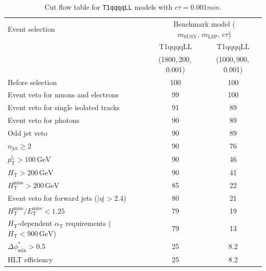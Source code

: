 \clearpage
\begin{table}[!h]
  \caption{Cut flow table for \texttt{T1qqqqLL} models with $c\tau = 0.001\unit{mm}$.} 
  \label{tab:cut_flow_ctau_0p001}
{\scriptsize%
\centering
\begin{tabular}{lcc}
  \hline
  Event selection & \multicolumn{2}{c}{Benchmark model ($m_\mathrm{SUSY},\,m_\mathrm{LSP},\,c\tau$)} \\
  \cline{2-3}
   & T1qqqqLL & T1qqqqLL \\
   & (1800,\,200,\,0.001) & (1000,\,900,\,0.001) \\
  \hline
  Before selection & 100\phantom{.1} & 100\phantom{.1} \\
  Event veto for muons and electrons & \phantom{1}99\phantom{.1} & 100\phantom{.1} \\
  Event veto for single isolated tracks & \phantom{1}91\phantom{.1} & \phantom{1}89\phantom{.1}  \\
  Event veto for photons & \phantom{1}90\phantom{.1} & \phantom{1}89\phantom{.1} \\
  Odd jet veto & \phantom{1}90\phantom{.1} & \phantom{1}89\phantom{.1} \\
   $n_{\mathrm{jet}} \geq 2$ & \phantom{1}90\phantom{.1} & \phantom{1}76\phantom{.1}  \\
   $p_{\mathrm{T}}^{\mathrm{j_1}} > 100\,\mathrm{GeV}$ & \phantom{1}90\phantom{.1} & \phantom{1}46\phantom{.1} \\
   $H_{\mathrm{T}} > 200\,\mathrm{GeV}$ & \phantom{1}90\phantom{.1} & \phantom{1}41\phantom{.1}  \\
  $H_{\mathrm{T}}^{\mathrm{miss}} > 200\,\mathrm{GeV}$ & \phantom{1}85\phantom{.1} & \phantom{1}22\phantom{.1}  \\
  Event veto for forward jets ($|\eta| > 2.4$) & \phantom{1}80\phantom{.1} & \phantom{1}21\phantom{.1}  \\
  $H_{\mathrm{T}}^{\mathrm{miss}} / E_{\mathrm{T}}^{\mathrm{miss}} < 1.25$ & \phantom{1}79\phantom{.1} & \phantom{1}19\phantom{.1}  \\
  $H_{\mathrm{T}}$-dependent $\alpha_{\mathrm{T}}$ requirements ($H_{\mathrm{T}} < 900\,\mathrm{GeV}$) & \phantom{1}79\phantom{.1} & \phantom{1}13\phantom{.1} \\
  $\Delta\phi^{*}_{\mathrm{min}} > 0.5$ & \phantom{1}25\phantom{.1} & \phantom{10}8.2  \\
  \hline
  HLT efficiency & \phantom{1}25\phantom{.1} & \phantom{10}8.2 \\
  \hline
\end{tabular}
}
\end{table}

